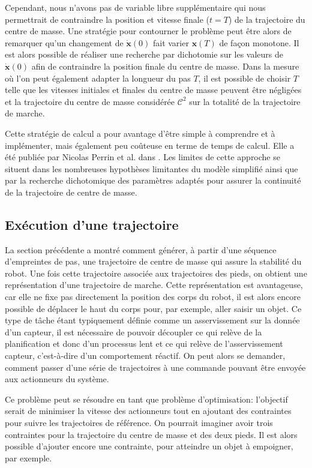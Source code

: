 Cependant, nous n'avons pas de variable libre supplémentaire qui nous
permettrait de contraindre la position et vitesse finale ($t=T$) de la
trajectoire du centre de masse. Une stratégie pour contourner le
problème peut être alors de remarquer qu'un changement de
$\dot{\mathbf{x}}(0)$ fait varier $\mathbf{x}(T)$ de façon
monotone. Il est alors possible de réaliser une recherche par
dichotomie sur les valeurs de $\dot{\mathbf{x}}(0)$ afin de
contraindre la position finale du centre de masse. Dans la mesure où
l'on peut également adapter la longueur du pas $T$, il est possible de
choisir $T$ telle que les vitesses initiales et finales du centre de
masse peuvent être négligées et la trajectoire du centre de masse
considérée $\mathcal{C}^2$ sur la totalité de la trajectoire de
marche.


Cette stratégie de calcul a pour avantage d'être simple à comprendre
et à implémenter, mais également peu coûteuse en terme de temps de
calcul. Elle a été publiée par Nicolas Perrin et al. dans
\cite{11perrin.icra}. Les limites de cette approche se situent dans
les nombreuses hypothèses limitantes du modèle simplifié ainsi que par
la recherche dichotomique des paramètres adaptés pour assurer la
continuité de la trajectoire de centre de masse.


\subsection{Exécution d'une trajectoire}


La section précédente a montré comment générer, à partir d'une
séquence d'empreintes de pas, une trajectoire de centre de masse qui
assure la stabilité du robot. Une fois cette trajectoire associée aux
trajectoires des pieds, on obtient une représentation d'une
trajectoire de marche. Cette représentation est avantageuse, car elle
ne fixe pas directement la position des corps du robot, il est alors
encore possible de déplacer le haut du corps pour, par exemple, aller
saisir un objet. Ce type de tâche étant typiquement définie comme un
asservissement sur la donnée d'un capteur, il est nécessaire de
pouvoir découpler ce qui relève de la planification et donc d'un
processus lent et ce qui relève de l'asservissement capteur,
c'est-à-dire d'un comportement réactif. On peut alors se demander,
comment passer d'une série de trajectoires à une commande pouvant être
envoyée aux actionneurs du système.


Ce problème peut se résoudre en tant que problème d'optimisation:
l'objectif serait de minimiser la vitesse des actionneurs tout en
ajoutant des contraintes pour suivre les trajectoires de référence. On
pourrait imaginer avoir trois contraintes pour la trajectoire du
centre de masse et des deux pieds. Il est alors possible d'ajouter
encore une contrainte, pour atteindre un objet à empoigner, par
exemple.


